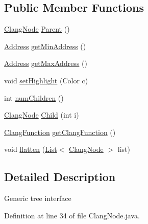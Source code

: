 \subsection*{Public Member Functions}
\begin{DoxyCompactItemize}
\item 
\mbox{\hyperlink{interfaceghidra_1_1app_1_1decompiler_1_1_clang_node}{Clang\+Node}} \mbox{\hyperlink{interfaceghidra_1_1app_1_1decompiler_1_1_clang_node_a27b0287e5069850a61b4312f7d2737a4}{Parent}} ()
\item 
\mbox{\hyperlink{class_address}{Address}} \mbox{\hyperlink{interfaceghidra_1_1app_1_1decompiler_1_1_clang_node_a28f86ac40636cd77392e26367db69dc3}{get\+Min\+Address}} ()
\item 
\mbox{\hyperlink{class_address}{Address}} \mbox{\hyperlink{interfaceghidra_1_1app_1_1decompiler_1_1_clang_node_a91e8beccce17b875e07d7c0747b43a97}{get\+Max\+Address}} ()
\item 
void \mbox{\hyperlink{interfaceghidra_1_1app_1_1decompiler_1_1_clang_node_a4c8a1dc76211ce497441c58554675f55}{set\+Highlight}} (Color c)
\item 
int \mbox{\hyperlink{interfaceghidra_1_1app_1_1decompiler_1_1_clang_node_a28f5c1cfc3842ee74333e5d5a5910976}{num\+Children}} ()
\item 
\mbox{\hyperlink{interfaceghidra_1_1app_1_1decompiler_1_1_clang_node}{Clang\+Node}} \mbox{\hyperlink{interfaceghidra_1_1app_1_1decompiler_1_1_clang_node_a7bf351bf5951fb71a5c55fdb311736be}{Child}} (int i)
\item 
\mbox{\hyperlink{classghidra_1_1app_1_1decompiler_1_1_clang_function}{Clang\+Function}} \mbox{\hyperlink{interfaceghidra_1_1app_1_1decompiler_1_1_clang_node_a715989d3fa33942a85517fae04a70ac0}{get\+Clang\+Function}} ()
\item 
void \mbox{\hyperlink{interfaceghidra_1_1app_1_1decompiler_1_1_clang_node_a0283101b063f37008afb65626cb21f74}{flatten}} (\mbox{\hyperlink{xml_8hh_ab5ab62f46b3735557c125f91b40ac155}{List}}$<$ \mbox{\hyperlink{interfaceghidra_1_1app_1_1decompiler_1_1_clang_node}{Clang\+Node}} $>$ list)
\end{DoxyCompactItemize}


\subsection{Detailed Description}
Generic tree interface 

Definition at line 34 of file Clang\+Node.\+java.



